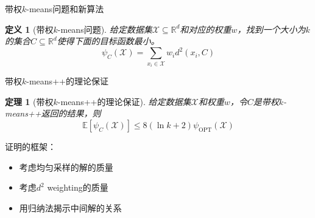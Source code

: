 \documentclass[notheorems]{beamer}
\newcommand{\R}{\mathbb{R}}
\newcommand{\E}{\mathbb{E}}
\newtheorem{theorem}{定理}
\newtheorem{definition}{定义}
\begin{document}
\begin{CJK*}{UTF8}{gbsn}
\begin{frame}{带权$k$-means问题和新算法}
	\begin{definition}[带权$k$-means问题]
		\footnotesize
		给定数据集$\mathcal{X} \subseteq \R^d$和对应的权重$w$，找到一个大小为$k$的集合$C \subseteq \R^d$使得下面的目标函数最小。
		\begin{equation}
		\psi_C(\mathcal{X})=\sum_{x_i \in \mathcal{X}}w_i d^2(x_i,C)
		\end{equation}
	\end{definition}
	\vspace*{-0.5cm}
	\begin{center}
	\end{center}
	
\end{frame}

\begin{frame}{带权$k$-means++的理论保证}
	\begin{theorem}[带权$k$-means++的理论保证]
		给定数据集$\mathcal{X}$和权重$w$，令$C$是带权$k$-means++返回的结果，则
		\begin{equation}
			\E[\psi_C(\mathcal{X})] \leq 8(\ln k + 2) \psi_\text{OPT}(\mathcal{X})
		\end{equation}
	\end{theorem}
	证明的框架：
	\begin{itemize}
		\item 考虑均匀采样的解的质量
		\item 考虑$d^2$ weighting的质量
		\item 用归纳法揭示中间解的关系
	\end{itemize}
\end{frame}


\end{CJK*}
\end{document}
